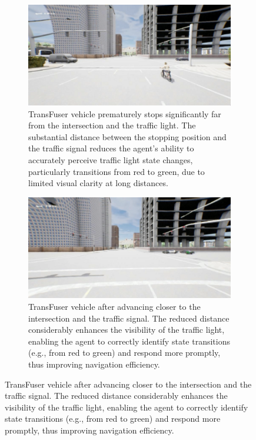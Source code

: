 \begin{figure}[htbp]
    \centering
    \begin{subfigure}[t]{1\columnwidth}
        \centering
        \includegraphics[width=\linewidth]{images/RS18_stopsFar.png}
        \caption{TransFuser vehicle prematurely stops significantly far from the intersection and the traffic light. The substantial distance between the stopping position and the traffic signal reduces the agent's ability to accurately perceive traffic light state changes, particularly transitions from red to green, due to limited visual clarity at long distances.}
        \label{fig:tf_tlight_premature_stop}
    \end{subfigure}
    \hfill
    \begin{subfigure}[t]{1\columnwidth}
        \centering
        \includegraphics[width=\linewidth]{images/RS18_closer.png}
        \caption{TransFuser vehicle after advancing closer to the intersection and the traffic signal. The reduced distance considerably enhances the visibility of the traffic light, enabling the agent to correctly identify state transitions (e.g., from red to green) and respond more promptly, thus improving navigation efficiency.}

\end{subfigure}
\end{figure}
